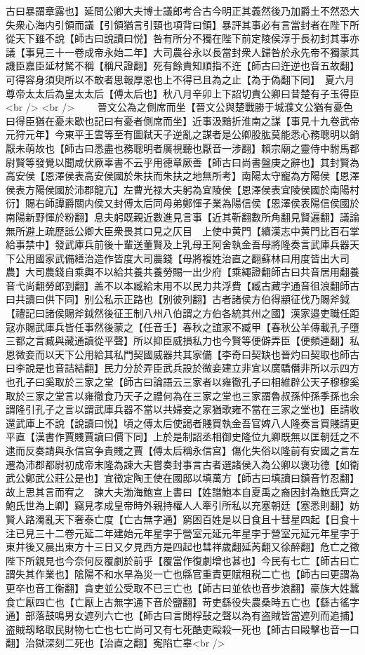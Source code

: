 古曰暴謂章露也】延問公卿大夫博士議郎考合古今明正其義然後乃加爵土不然恐大失衆心海内引領而議【引領猶言引頸也項背曰領】暴評其事必有言當封者在陛下所從天下雖不說【師古曰說讀曰悦】咎有所分不獨在陛下前定陵侯淳于長初封其事亦議【事見三十一卷成帝永始二年】大司農谷永以長當封衆人歸咎於永先帝不獨蒙其譏臣嘉臣延材駑不稱【稱尺證翻】死有餘責知順指不迕【師古曰迕逆也音五故翻】可得容身須臾所以不敢者思報厚恩也上不得已且為之止【為于偽翻下同】　夏六月尊帝太太后為皇太太后【傅太后也】秋八月辛卯上下詔切責公卿曰昔楚有子玉得臣<br />
<br />
　　晉文公為之側席而坐【晉文公與楚戰勝于城濮文公猶有憂色曰得臣猶在憂未歇也記曰有憂者側席而坐】近事汲黯折淮南之謀【事見十九卷武帝元狩元年】今東平王雲等至有圖弑天子逆亂之謀者是公卿股肱莫能悉心務聰明以銷厭未萌故也【師古曰悉盡也務聰明者廣視聽也厭音一涉翻】賴宗廟之靈侍中駙馬都尉賢等發覺以聞咸伏厥辜書不云乎用德章厥善【師古曰尚書盤庚之辭也】其封賢為高安侯【恩澤侯表高安侯國於朱扶而朱扶之地無所考】南陽太守寵為方陽侯【恩澤侯表方陽侯國於沛郡龍亢】左曹光禄大夫躬為宜陵侯【恩澤侯表宜陵侯國於南陽村衍】賜右師譚爵關内侯又封傅太后同母弟鄭惲子業為陽信侯【恩澤侯表陽信侯國於南陽新野惲於粉翻】息夫躬既親近數進見言事【近其靳翻數所角翻見賢遍翻】議論無所避上疏歷詆公卿大臣衆畏其口見之仄目　上使中黄門【續漢志中黄門比百石掌給事禁中】發武庫兵前後十輩送董賢及上乳母王阿舍執金吾母將隆奏言武庫兵器天下公用國家武備繕治造作皆度大司農錢【毋將複姓治直之翻蘇林曰用度皆出大司農】大司農錢自乘輿不以給共養共養勞賜一出少府【乘繩證翻師古曰共音居用翻養音弋尚翻勞郎到翻】盖不以本臧給末用不以民力共浮費【臧古藏字通音徂浪翻師古曰共讀曰供下同】别公私示正路也【别彼列翻】古者諸侯方伯得顓征伐乃賜斧鉞【禮記曰諸侯賜斧鉞然後征王制八州八伯謂之方伯各統其州之國】漢家邉吏職任距寇亦賜武庫兵皆任事然後蒙之【任音壬】春秋之誼家不臧甲【春秋公羊傳載孔子墮三都之言臧與藏通讀從平聲】所以抑臣威損私力也今賢等便僻弄臣【便頻連翻】私恩微妾而以天下公用給其私門契國威器共其家備【李奇曰契缺也晉灼曰契取也師古曰李說是也音詰結翻】民力分於弄臣武兵設於微妾建立非宜以廣驕僭非所以示四方也孔子曰奚取於三家之堂【師古曰論語云三家者以雍徹孔子曰相維辟公天子穆穆奚取於三家之堂言以雍徹食乃天子之禮何為在三家之堂也三家謂魯叔孫仲孫季孫也余謂隆引孔子之言以謂武庫兵器不當以共婦妾之家猶歌雍不當在三家之堂也】臣請收還武庫上不說【說讀曰悦】頃之傅太后使謁者賤買執金吾官婢八人隆奏言買賤請更平直【漢書作賈賤賈讀曰價下同】上於是制詔丞相御史隆位九卿既無以匡朝廷之不逮而反奏請與永信宫争貴賤之賈【傅太后稱永信宫】傷化失俗以隆前有安國之言左遷為沛郡都尉初成帝末隆為諫大夫嘗奏封事言古者選諸侯入為公卿以褒功德【如衛武公鄭武公莊公是也】宜徵定陶王使在國邸以填萬方【師古曰填讀曰鎮音竹忍翻】故上思其言而宥之　諫大夫渤海鮑宣上書曰【姓譜鮑本自夏禹之裔因封為鮑氏齊之鮑氏世為上卿】竊見孝成皇帝時外親持權人人牽引所私以充塞朝廷【塞悉則翻】妨賢人路濁亂天下奢泰亡度【亡古無字通】窮困百姓是以日食且十彗星四起【日食十注已見三十二卷元延二年建始元年星孛于營室元延元年星孛于營室元延元年星孛于東井後又晨出東方十三日又夕見西方是四起也彗祥歲翻延芮翻又徐醉翻】危亡之徵陛下所親見也今奈何反覆劇於前乎【覆當作復劇增也甚也】今民有七亡【師古曰亡謂失其作業也】隂陽不和水旱為災一亡也縣官重責更賦租税二亡也【師古曰更謂為更卒也音工衡翻】貪吏並公受取不已三亡也【師古曰並依也音步浪翻】豪族大姓蠶食亡厭四亡也【亡厭上古無字通下音於鹽翻】苛吏繇役失農桑時五亡也【繇古徭字通】部落鼓鳴男女遮列六亡也【師古曰言閒桴鼔之聲以為有盗賊皆當遮列而追捕】盗賊刼略取民財物七亡也七亡尚可又有七死酷吏毆殺一死也【師古曰毆擊也音一口翻】治獄深刻二死也【治直之翻】寃陷亡辜<br />
